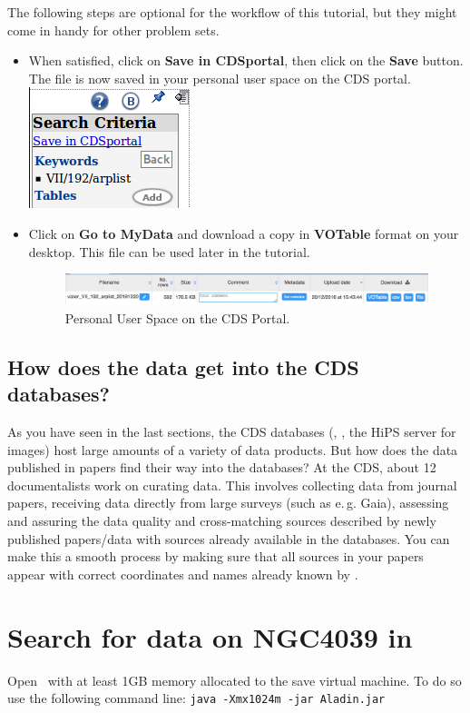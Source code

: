 \documentclass [a4paper, 12pt]{article}
\begin{document}
The following steps are optional for the workflow of this tutorial, but they
might come in handy for other problem sets.
\begin{itemize}
\item When satisfied, click on \textbf{Save in CDSportal}, then click
on the \textbf{Save} button. The file is now saved in your personal
user space on the CDS portal.\includegraphics[width=0.1
\textwidth]{../images/vizier_saveto_CDSportal.png}
\item Click on \textbf{Go to MyData} and download a copy in
\textbf{VOTable} format on your desktop. This file can be used later
in the tutorial.
\begin{figure}[H]
\center
\includegraphics[width=1  \textwidth]{../images/cdsportal_mydata.jpg}
\caption{Personal User Space on the CDS Portal.}
\label{fig:download}
\end{figure}
\end{itemize}

\subsection{How does the data get into the CDS databases?}
As you have seen in the last sections, the CDS databases (\simbad, \vizier, the
HiPS server for images) host large amounts of a variety of data products. But
how does the data published in papers find their way into the databases? At the
CDS, about 12 documentalists work on curating data. This involves collecting
data from journal papers, receiving data directly from large surveys (such as
e.\,g. Gaia), assessing and assuring the data quality and cross-matching
sources described by newly published papers/data with sources already available
in the databases. You can make this a smooth process by making sure that all
sources in your papers appear with correct coordinates and names already known
by \simbad.

\section{Search for data on NGC4039 in \aladin}

Open \aladin\ with at least 1GB memory allocated to the save virtual
machine. To do so use the following command line: \texttt{java -Xmx1024m -jar
Aladin.jar}
\end{document}
